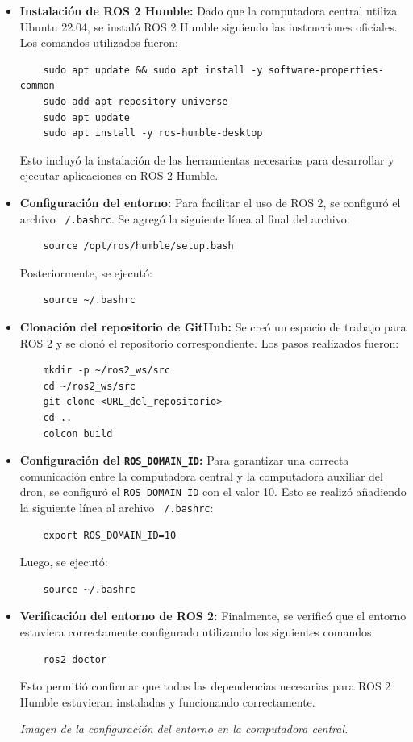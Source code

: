 \begin{itemize}
    \item \textbf{Instalación de ROS 2 Humble:} 
    Dado que la computadora central utiliza Ubuntu 22.04, se instaló ROS 2 Humble siguiendo las instrucciones oficiales. Los comandos utilizados fueron:
    \begin{verbatim}
    sudo apt update && sudo apt install -y software-properties-common
    sudo add-apt-repository universe
    sudo apt update
    sudo apt install -y ros-humble-desktop
    \end{verbatim}
    Esto incluyó la instalación de las herramientas necesarias para desarrollar y ejecutar aplicaciones en ROS 2 Humble.

    \item \textbf{Configuración del entorno:} 
    Para facilitar el uso de ROS 2, se configuró el archivo \texttt{~/.bashrc}. Se agregó la siguiente línea al final del archivo:
    \begin{verbatim}
    source /opt/ros/humble/setup.bash
    \end{verbatim}
    Posteriormente, se ejecutó:
    \begin{verbatim}
    source ~/.bashrc
    \end{verbatim}

    \item \textbf{Clonación del repositorio de GitHub:} 
    Se creó un espacio de trabajo para ROS 2 y se clonó el repositorio correspondiente. Los pasos realizados fueron:
    \begin{verbatim}
    mkdir -p ~/ros2_ws/src
    cd ~/ros2_ws/src
    git clone <URL_del_repositorio>
    cd ..
    colcon build
    \end{verbatim}

    \item \textbf{Configuración del \texttt{ROS\_DOMAIN\_ID}:} 
    Para garantizar una correcta comunicación entre la computadora central y la computadora auxiliar del dron, se configuró el \texttt{ROS\_DOMAIN\_ID} con el valor 10. Esto se realizó añadiendo la siguiente línea al archivo \texttt{~/.bashrc}:
    \begin{verbatim}
    export ROS_DOMAIN_ID=10
    \end{verbatim}
    Luego, se ejecutó:
    \begin{verbatim}
    source ~/.bashrc
    \end{verbatim}
    
    \item \textbf{Verificación del entorno de ROS 2:} 
    Finalmente, se verificó que el entorno estuviera correctamente configurado utilizando los siguientes comandos:
    \begin{verbatim}
    ros2 doctor
    \end{verbatim}
    Esto permitió confirmar que todas las dependencias necesarias para ROS 2 Humble estuvieran instaladas y funcionando correctamente.
    
    \begin{center} 
        \textit{Imagen de la configuración del entorno en la computadora central.} 
    \end{center}
\end{itemize}


